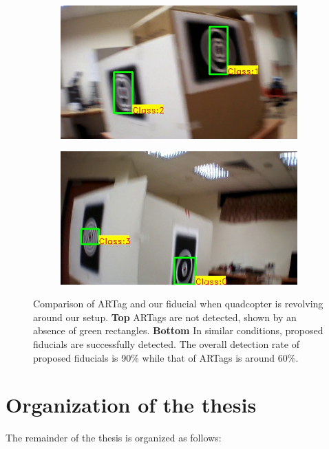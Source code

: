 \begin{figure}
\begin{subfigure}[b]{0.24\textwidth}
\end{subfigure}
\begin{subfigure}[b]{0.24\textwidth}
\includegraphics[width=\linewidth]{figures/fiducial/setup_our/output_2/output_35.jpg}
\end{subfigure}
\begin{subfigure}[b]{0.24\textwidth}
\includegraphics[width=\linewidth]{figures/fiducial/setup_our/output_6/output_943.jpg}
\end{subfigure}
\caption[Comparison of ARTag and our fiducial when quadcopter is
  revolving around our setup]{Comparison of ARTag and our fiducial when quadcopter is
  revolving around our setup. 
\textbf{Top} ARTags are not detected, shown by an absence of green rectangles.
\textbf{Bottom} In similar conditions, proposed fiducials are successfully
detected. The overall detection rate of proposed fiducials is 90\% while that of
ARTags is around 60\%. }
\label{fig:fiducials_result}
\end{figure}
	
\section{Organization of the thesis}
The remainder of the thesis is organized as follows:\\

